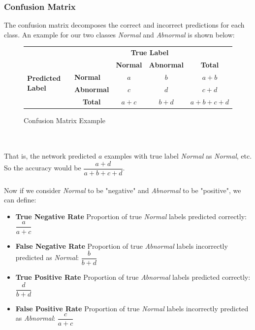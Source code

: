 \documentclass[11pt]{article} %
\theoremstyle{plain}
\theoremstyle{definition}
\begin{document}
\subsubsection{Confusion Matrix}
The confusion matrix decomposes the correct and incorrect predictions for each class. An example for our two classes \textit{Normal} and \textit{Abnormal} is shown below:
\begin{figure}[ht]
    \centering
  \caption{Confusion Matrix Example}
    \begin{tabular}{l|l|c|c|c}
    \multicolumn{2}{c}{}&\multicolumn{2}{c}{\textbf{True Label}}&\\
    \cline{3-4}
    \multicolumn{2}{c|}{}&\textbf{Normal}&\textbf{Abnormal}&\multicolumn{1}{c}{\textbf{Total}}\\
    \cline{2-4}
    \multirow{2}{*}{\textbf{Predicted Label}}& \textbf{Normal} & $a$ & $b$ & $a+b$\\
    \cline{2-4}
    & \textbf{Abnormal} & $c$ & $d$ & $c+d$\\
    \cline{2-4}
    \multicolumn{1}{c}{} & \multicolumn{1}{c}{\textbf{Total}} & \multicolumn{1}{c}{$a+c$} & \multicolumn{1}{c}{$b+d$} & \multicolumn{1}{c}{$a+b+c+d$}\\
    \end{tabular}
    \label{fig:confusion_matrix_example}
\end{figure}
\\
\\
\noindent
That is, the network predicted \(a\) examples with true label \textit{Normal} as \textit{Normal}, etc. So the accuracy would be \( \dfrac{a+d}{a+b+c+d}\). 
\\
\\
\noindent
Now if we consider \textit{Normal} to be "negative" and \textit{Abnormal} to be "positive", we can define:
\begin{itemize}
  \item \textbf{True Negative Rate} Proportion of true \textit{Normal} labels predicted correctly: \( \dfrac{a}{a+c} \)
  \item \textbf{False Negative Rate} Proportion of true \textit{Abnormal} labels incorrectly predicted as \textit{Normal}: \( \dfrac{b}{b+d} \)
  \item \textbf{True Positive Rate} Proportion of true \textit{Abnormal} labels predicted correctly:  \( \dfrac{d}{b+d} \)
  \item \textbf{False Positive Rate} Proportion of true \textit{Normal} labels incorrectly predicted as \textit{Abnormal}: \( \dfrac{c}{a+c} \)
\end{itemize}
\end{document}
